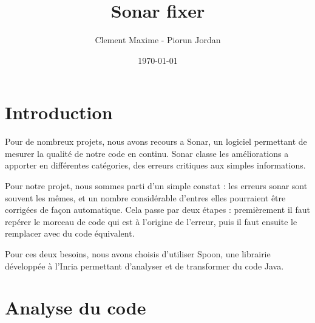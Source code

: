 \documentclass[a4paper]{article}
\begin{document}
\clearpage
\vspace*{\fill}
\begin{center}
\begin{minipage}{.6\textwidth}
\title{Sonar fixer}
\author{Clement Maxime - Piorun Jordan}
\date{\today}
\maketitle
\end{minipage}

\end{center}
\vfill %
\clearpage

\newpage
\tableofcontents
\newpage

\section{Introduction}
\par Pour de nombreux projets, nous avons recours a Sonar, un logiciel permettant de mesurer la qualité de notre code en continu. Sonar classe les améliorations a apporter en différentes catégories, des erreurs critiques aux simples informations.
\\
\par Pour notre projet, nous sommes parti d'un simple constat : les erreurs sonar sont souvent les mêmes, et un nombre considérable d'entres elles pourraient être corrigées de façon automatique. Cela passe par deux étapes : premièrement il faut repérer le morceau de code qui est à l'origine de l'erreur, puis il faut ensuite le remplacer avec du code équivalent.
\\
\par Pour ces deux besoins, nous avons choisis d'utiliser Spoon, une librairie développée à l'Inria permettant d'analyser et de transformer du code Java.

\newpage
\section{Analyse du code}
\end{document}
